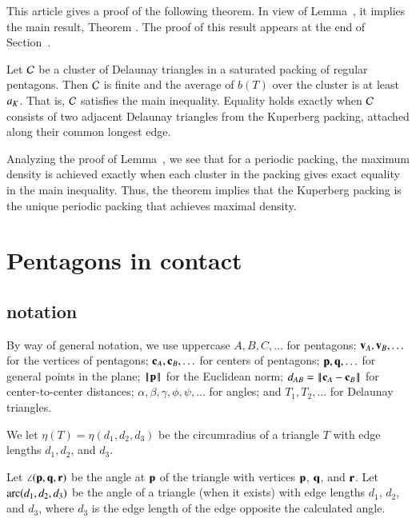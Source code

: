 This article gives a proof of the following theorem. In view of Lemma~,
it implies the main result, Theorem .  The proof of this result appears
at the end of Section~.

\begin{theorem}
  Let $\mathcal C$ be a cluster of Delaunay triangles in a saturated
  packing of regular pentagons.  Then $\mathcal C$ is finite and the average
  of $b(T)$ over the cluster is at least $a_K$.  That is, $\mathcal C$
  satisfies the main inequality.  Equality holds exactly when $\mathcal C$
  consists of two adjacent Delaunay triangles from the Kuperberg
  packing, attached along their common longest edge.
\end{theorem}

\begin{remark}
Analyzing the proof of Lemma~, we see that for a
periodic packing, the maximum density is achieved exactly when each
 cluster in the packing gives exact equality in the main inequality.
Thus, the theorem implies that the Kuperberg packing is the
unique periodic packing that achieves maximal density.
\end{remark}



\section{Pentagons in contact}


\subsection{notation}

By way of general notation, we use uppercase $A,B,C,\ldots$ for
pentagons; ${\mathbf v}_A,{\mathbf v}_B,\ldots$ for the vertices of pentagons;
${\mathbf c}_A,{\mathbf c}_B,\ldots$ for centers of pentagons; ${\mathbf p},{\mathbf q},\ldots$ for
general points in the plane; ${\hbox{\ensuremath{\hspace{0.1em}|\hspace{-0.1em}|\hspace{0.1em}}}{\mathbf p}\hbox{\ensuremath{\hspace{0.1em}|\hspace{-0.1em}|\hspace{0.1em}}}}$ for the Euclidean norm;
$\dx{AB}=\dd{A}{B}$ for center-to-center distances;
$\alpha,\beta,\gamma,\phi,\psi,\ldots$ for angles; and $T_1,T_2,\ldots$
for Delaunay triangles.

We let $\eta(T) = \eta(d_1,d_2,d_3)$ be the circumradius of a triangle
$T$ with edge lengths $d_1,d_2$, and $d_3$.

Let $\angle({\mathbf p},{\mathbf q},{\mathbf r})$ be the angle at ${\mathbf p}$ of the triangle with
vertices ${\mathbf p}$, ${\mathbf q}$, and ${\mathbf r}$.  Let $\operatorname{arc}(d_1,d_2,d_3)$ be the angle
of a triangle (when it exists) with edge lengths $d_1$, $d_2$, and
$d_3$, where $d_3$ is the edge length of the edge opposite the
calculated angle.




